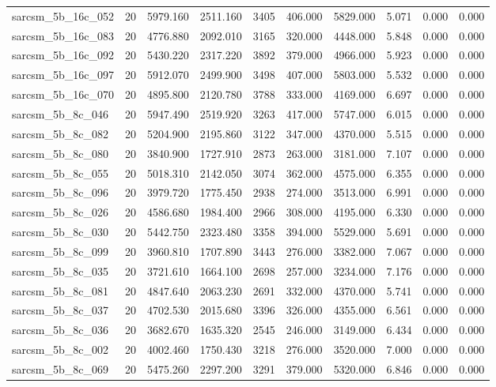 \begin{tabular}{lrrrrrrrrr}
sarcsm\_5b\_16c\_052 & 20 & 5979.160 & 2511.160 & 3405 & 406.000 & 5829.000 & 5.071 & 0.000 & 0.000 \\
sarcsm\_5b\_16c\_083 & 20 & 4776.880 & 2092.010 & 3165 & 320.000 & 4448.000 & 5.848 & 0.000 & 0.000 \\
sarcsm\_5b\_16c\_092 & 20 & 5430.220 & 2317.220 & 3892 & 379.000 & 4966.000 & 5.923 & 0.000 & 0.000 \\
sarcsm\_5b\_16c\_097 & 20 & 5912.070 & 2499.900 & 3498 & 407.000 & 5803.000 & 5.532 & 0.000 & 0.000 \\
sarcsm\_5b\_16c\_070 & 20 & 4895.800 & 2120.780 & 3788 & 333.000 & 4169.000 & 6.697 & 0.000 & 0.000 \\
sarcsm\_5b\_8c\_046 & 20 & 5947.490 & 2519.920 & 3263 & 417.000 & 5747.000 & 6.015 & 0.000 & 0.000 \\
sarcsm\_5b\_8c\_082 & 20 & 5204.900 & 2195.860 & 3122 & 347.000 & 4370.000 & 5.515 & 0.000 & 0.000 \\
sarcsm\_5b\_8c\_080 & 20 & 3840.900 & 1727.910 & 2873 & 263.000 & 3181.000 & 7.107 & 0.000 & 0.000 \\
sarcsm\_5b\_8c\_055 & 20 & 5018.310 & 2142.050 & 3074 & 362.000 & 4575.000 & 6.355 & 0.000 & 0.000 \\
sarcsm\_5b\_8c\_096 & 20 & 3979.720 & 1775.450 & 2938 & 274.000 & 3513.000 & 6.991 & 0.000 & 0.000 \\
sarcsm\_5b\_8c\_026 & 20 & 4586.680 & 1984.400 & 2966 & 308.000 & 4195.000 & 6.330 & 0.000 & 0.000 \\
sarcsm\_5b\_8c\_030 & 20 & 5442.750 & 2323.480 & 3358 & 394.000 & 5529.000 & 5.691 & 0.000 & 0.000 \\
sarcsm\_5b\_8c\_099 & 20 & 3960.810 & 1707.890 & 3443 & 276.000 & 3382.000 & 7.067 & 0.000 & 0.000 \\
sarcsm\_5b\_8c\_035 & 20 & 3721.610 & 1664.100 & 2698 & 257.000 & 3234.000 & 7.176 & 0.000 & 0.000 \\
sarcsm\_5b\_8c\_081 & 20 & 4847.640 & 2063.230 & 2691 & 332.000 & 4370.000 & 5.741 & 0.000 & 0.000 \\
sarcsm\_5b\_8c\_037 & 20 & 4702.530 & 2015.680 & 3396 & 326.000 & 4355.000 & 6.561 & 0.000 & 0.000 \\
sarcsm\_5b\_8c\_036 & 20 & 3682.670 & 1635.320 & 2545 & 246.000 & 3149.000 & 6.434 & 0.000 & 0.000 \\
sarcsm\_5b\_8c\_002 & 20 & 4002.460 & 1750.430 & 3218 & 276.000 & 3520.000 & 7.000 & 0.000 & 0.000 \\
sarcsm\_5b\_8c\_069 & 20 & 5475.260 & 2297.200 & 3291 & 379.000 & 5320.000 & 6.846 & 0.000 & 0.000 \\

\end{tabular}
